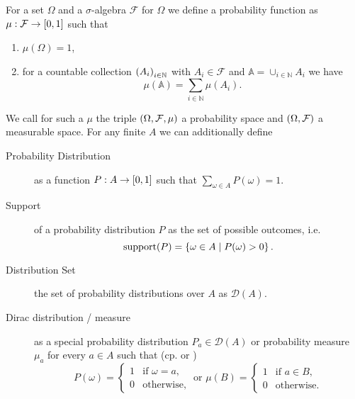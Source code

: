 \begin{definition}
  For a set $\Omega$ and a $\sigma$-algebra $\mathcal{F}$ for $\Omega$ we
  define a probability function as $\mu:\mathcal{F}\rightarrow\left[0,1\right]$
  such that
  \begin{enumerate}
    \item $\mu(\Omega) = 1$,
    \item for a countable collection $\left(A_{i}\right)_{i\in\mathbb{N}}$ with
      $A_{i}\in\mathcal{F}$ and $\mathbb{A} = \cup_{i\in\mathbb{N}}A_{i}$ we
      have
      \begin{equation*}
        \mu(\mathbb{A}) = \sum_{i\in\mathbb{N}}\mu(A_{i}).
      \end{equation*}
  \end{enumerate}
  We call for such a $\mu$ the triple $\left(\Omega,\mathcal{F},\mu\right)$ a 
  probability space and $\left(\Omega, \mathcal{F}\right)$ a measurable space. For
  any finite $A$ we can additionally define
  \begin{description}
    \item [Probability Distribution] as a function
      $P:A\rightarrow\left[0,1\right]$ such that
      $\sum_{\omega\in A}P(\omega) = 1$.
    \item [Support] of a probability distribution $P$ as the set of possible
      outcomes, i.e.
      \begin{equation*}
        \operatorname{support}(P) = \left\{\omega\in A\mid P(\omega) > 0\right\}.
      \end{equation*}
    \item [Distribution Set] the set of probability distributions over $A$ as
      $\mathcal{D}(A)$.
    \item [Dirac distribution / measure] as a special probability distribution 
      $P_{a}\in\mathcal{D}(A)$ or probability measure $\mu_{a}$ for every 
      $a\in A$ such that (cp. \cite[Example 1.30]{Klenke} or \cite{POSG})
      \begin{equation*}
        P(\omega) = \begin{cases}
          1&\text{if }\omega = a,\\
          0&\text{otherwise},
        \end{cases}
        \text{ or }
        \mu(B) = \begin{cases}
          1&\text{if }a\in B,\\
          0&\text{otherwise}.
        \end{cases}
      \end{equation*}
  \end{description}
\end{definition}

